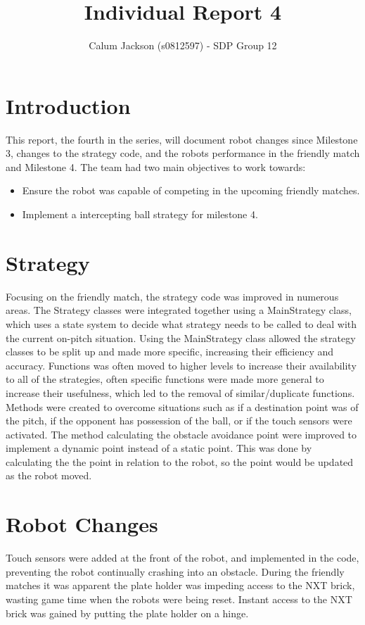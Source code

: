 \documentclass[12pt]{IEEEtran}
\begin{document}
	
\title{Individual Report 4}

\author{Calum Jackson (s0812597) - 
SDP Group 12}

\maketitle


\section{Introduction}
This report, the fourth in the series, will document robot changes since Milestone 3, changes to the strategy code, and the robots performance in the friendly match and Milestone 4. The team had two main objectives to work towards:
\begin{itemize}
\item Ensure the robot was capable of competing in the upcoming friendly matches.
\item Implement a intercepting ball strategy for milestone 4.
\end{itemize}

\section{Strategy}
Focusing on the friendly match, the strategy code was improved in numerous areas.  The Strategy classes were integrated together using a MainStrategy class, which uses a state system to decide what strategy needs to be called to deal with the current on-pitch situation. Using the MainStrategy class allowed the strategy classes to be split up and made more specific, increasing their efficiency and accuracy. Functions was often moved to higher levels to increase their availability to all of the strategies, often specific functions were made more general to increase their usefulness, which led to the removal of similar/duplicate	 functions.
Methods were created to overcome situations such as if a destination point was of the pitch, if the opponent has possession of the ball, or if the touch sensors were activated.
The method calculating the obstacle avoidance point were improved to implement a dynamic point instead of a static point. This was done by calculating the the point in relation to the robot, so the point would be updated as the robot moved.

\section{Robot Changes}
Touch sensors were added at the front of the robot, and implemented in the code, preventing the robot continually crashing into an obstacle. During the friendly matches it was apparent the plate holder was impeding access to the NXT brick, wasting game time when the robots were being reset. Instant access to the NXT brick was gained by putting the plate holder on a hinge.
\end{document}
